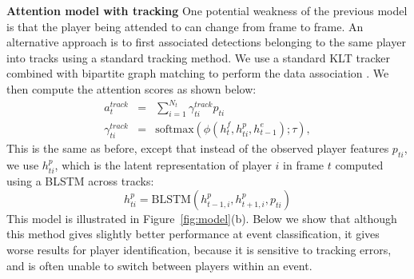 \noindent \textbf{Attention model with tracking}
One potential weakness of the previous model is that the
player being attended to can change from frame to frame.
An alternative approach is to first associated detections
belonging to the same player into tracks using a standard
tracking method. We use a standard KLT tracker combined with
bipartite graph matching to perform the data association
\cite{Veenman_PAMI2001}.
We then compute the attention scores as shown below:
%
\begin{eqnarray} 
\label{eq:track}
  a_t^{track} & = & \sum_{i=1}^{N_t} \gamma_{ti}^{track} p_{ti} 
\\ \nonumber
  \gamma_{ti}^{track} & = & \text{softmax} \left(\phi\left(h^f_t, h^p_{ti}, h^e_{t-1}\right); \tau\right),
\end{eqnarray}
This is the same as before, except 
that instead of the observed player features $p_{ti}$, 
we use $h_{ti}^p$, which is the latent representation of player $i$ in frame
$t$ computed using a BLSTM across tracks:
\[
  h_{ti}^p = \mbox{BLSTM}(h_{t-1,i}^p, h_{t+1,i}^p, p_{ti})
\]
This model is illustrated in Figure~\ref{fig:model}(b).
Below  we show that although this method gives slightly better
performance at event classification, it gives worse results for player
identification, because it is sensitive to tracking errors, and
is often unable to switch between players within an event.



